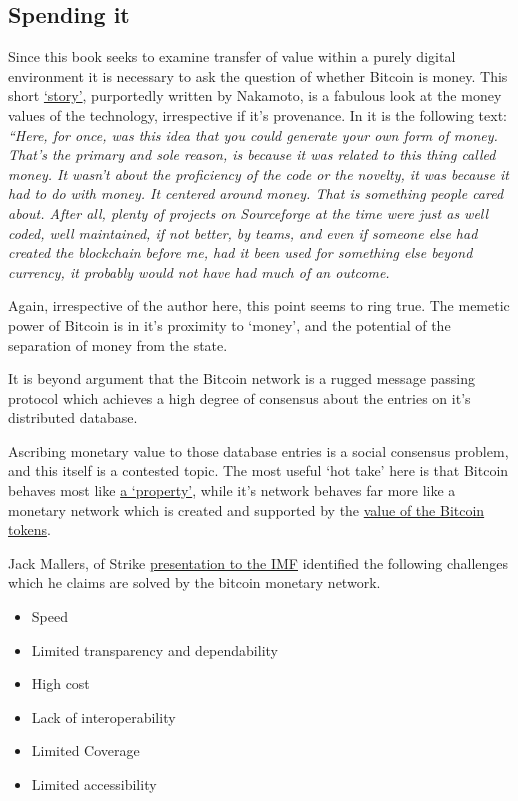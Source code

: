 \subsection{Spending it}
Since this book seeks to examine transfer of value within a purely digital environment it is necessary to ask the question of whether Bitcoin is money. This short \href{https://bitcoin-zar.blogspot.com/2018/07/duality-excerpt-by-satoshi-nakomoto.html}{`story'}, purportedly written by Nakamoto, is a fabulous look at the money values of the technology, irrespective if it's provenance. In it is the following text: \textit{``Here, for once, was this idea that you could generate your own form of money. That's the primary and sole reason, is because it was related to this thing called money. It wasn't about the proficiency of the code or the novelty, it was because it had to do with money. It centered around money. That is something people cared about. After all, plenty of projects on Sourceforge at the time were just as well coded, well maintained, if not better, by teams, and even if someone else had created the blockchain before me, had it been used for something else beyond currency, it probably would not have had much of an outcome.}\par
Again, irrespective of the author here, this point seems to ring true. The memetic power of Bitcoin is in it's proximity to `money', and the potential of the separation of money from the state. \par
It is beyond argument that the Bitcoin network is a rugged message passing protocol which achieves a high degree of consensus about the entries on it's distributed database.\par Ascribing monetary value to those database entries is a social consensus problem, and this itself is a contested topic. The most useful `hot take' here is that Bitcoin behaves most like \href{https://twitter.com/saylor/status/1395788419301773312}{a `property'}, while it's network behaves far more like a monetary network which is created and supported by the \href{https://saito.tech/an-response-to-paul-krugman-from-a-keynesian-bitcoiner/}{value of the Bitcoin tokens}. \par
Jack Mallers, of Strike \href{https://www.youtube.com/watch?v=jb-45m9f76I}{presentation to the IMF} identified the following challenges which he claims are solved by the bitcoin monetary network.
\begin{itemize}
\item Speed
\item Limited transparency and dependability
\item High cost
\item Lack of interoperability
\item Limited Coverage
\item Limited accessibility
\end{itemize}
